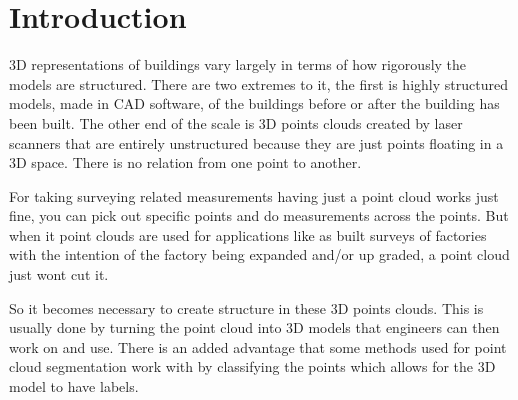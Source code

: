 

\section{Introduction}



3D representations of buildings vary largely in terms of how rigorously the models are structured. There are two extremes to it, the first is highly structured models, made in CAD software, of the buildings before or after the building has been built. The other end of the scale is 3D points clouds created by laser scanners that are entirely unstructured because they are just points floating in a 3D space. There is no relation from one point to another.

For taking surveying related measurements having just a point cloud works just fine, you can pick out specific points and do measurements across the points. But when it point clouds are used for applications like as built surveys of factories with the intention of the factory being expanded and/or up graded, a point cloud just wont cut it.

So it becomes necessary to create structure in these 3D points clouds. This is usually done by turning the point cloud into 3D models that engineers can then work on and use. There is an added advantage that some methods used for point cloud segmentation work with by classifying the points which allows for the 3D model to have labels.










